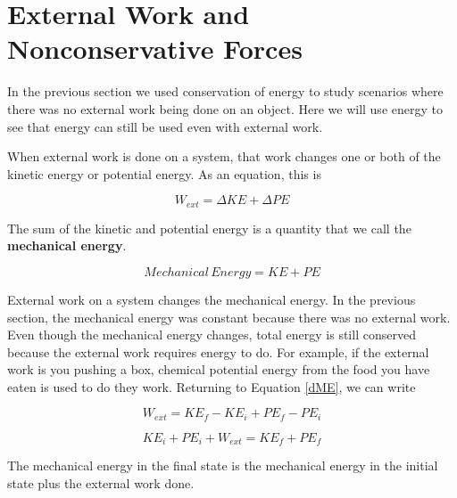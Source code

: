 \documentclass[12pt]{book}
\begin{document}
\section{External Work and Nonconservative Forces}

In the previous section we used conservation of energy to study scenarios where there was no external work being done on an object. Here we will use energy to see that energy can still be used even with external work.

When external work is done on a system, that work changes one or both of the kinetic energy or potential energy. As an equation, this is

\begin{equation}
W_{ext} = \Delta KE + \Delta PE
\label{dME}
\end{equation}

The sum of the kinetic and potential energy is a quantity that we call the \textbf{mechanical energy}.

\begin{equation}
Mechanical \, Energy = KE + PE
\end{equation}

External work on a system changes the mechanical energy. In the previous section, the mechanical energy was constant because there was no external work. Even though the mechanical energy changes, total energy is still conserved because the external work requires energy to do. For example, if the external work is you pushing a box, chemical potential energy from the food you have eaten is used to do they work. Returning to Equation \ref{dME}, we can write

\begin{equation}
W_{ext} = KE_f - KE_i + PE_f - PE_i
\end{equation}

\begin{equation}
KE_i + PE_i + W_{ext} = KE_f + PE_f
\label{wext}
\end{equation}

The mechanical energy in the final state is the mechanical energy in the initial state plus the external work done.
\end{document}
